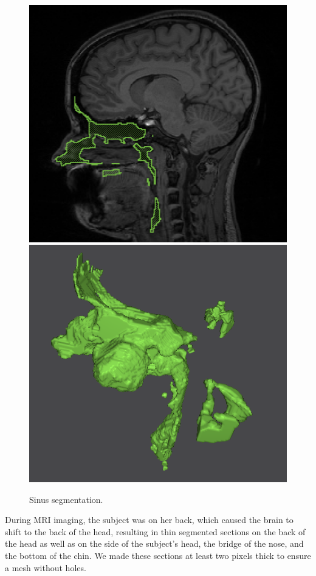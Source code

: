 \begin{figure}[H]
\begin{center}
\includegraphics[width=.49\textwidth]{Figures/sinus_sag}
\includegraphics[width=.49\textwidth]{Figures/sinus_iso}
\caption{Sinus segmentation.}
\label{fig:sinus}
\end{center}
\end{figure}

During MRI imaging, the subject was on her back, which caused the brain to shift to the back of the head, resulting in thin segmented sections on the back of the head as well as on the side of the subject's head, the bridge of the nose, and the bottom of the chin. We made these sections at least two pixels thick to ensure a mesh without holes.


